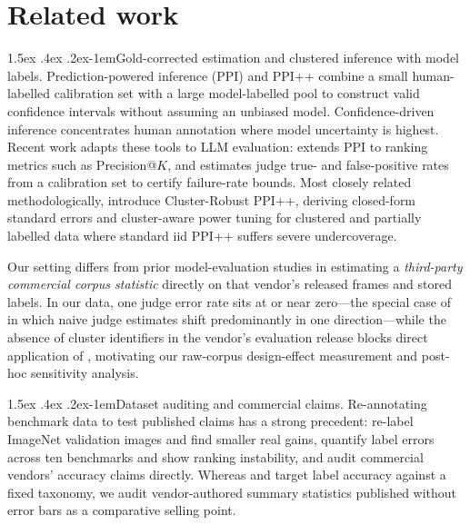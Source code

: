 \documentclass[11pt]{article}
\makeatletter
\renewcommand\paragraph{\@startsection{paragraph}{4}{\z@}%
  {1.5ex \@plus .4ex \@minus .2ex}{-1em}{\normalfont\normalsize\bfseries}}
\makeatother
\begin{document}
\section{Related work}
\label{sec:related}

\paragraph{Gold-corrected estimation and clustered inference with model labels.}
Prediction-powered inference (PPI) \citep{angelopoulos2023ppi} and PPI++
\citep{angelopoulos2023ppiplusplus} combine a small human-labelled calibration set with a large
model-labelled pool to construct valid confidence intervals without assuming an unbiased model.
Confidence-driven inference \citep{gligoric2025cdi} concentrates human annotation where model
uncertainty is highest. Recent work adapts these tools to LLM evaluation:
\citet{divekar2026ranking} extends PPI to ranking metrics such as Precision@$K$, and
\citet{feng2026noisybutvalid} estimates judge true- and false-positive rates from a calibration
set to certify failure-rate bounds. Most closely related methodologically,
\citet{broska2026crppi} introduce Cluster-Robust PPI++, deriving closed-form standard errors and
cluster-aware power tuning for clustered and partially labelled data where standard iid PPI++
suffers severe undercoverage.

Our setting differs from prior model-evaluation studies in estimating a \emph{third-party
commercial corpus statistic} directly on that vendor's released frames and stored labels. In our
data, one judge error rate sits at or near zero---the special case of
\citet{feng2026noisybutvalid} in which naive judge estimates shift predominantly in one
direction---while the absence of cluster identifiers in the vendor's evaluation release blocks
direct application of \citet{broska2026crppi}, motivating our raw-corpus design-effect
measurement and post-hoc sensitivity analysis.

\paragraph{Dataset auditing and commercial claims.}
Re-annotating benchmark data to test published claims has a strong precedent:
\citet{beyer2020imagenet} re-label ImageNet validation images and find smaller real gains,
\citet{northcutt2021labelerrors} quantify label errors across ten benchmarks and show ranking
instability, and \citet{raji2019actionable} audit commercial vendors' accuracy claims directly.
Whereas \citet{beyer2020imagenet} and \citet{northcutt2021labelerrors} target label accuracy
against a fixed taxonomy, we audit vendor-authored summary statistics published without error bars
as a comparative selling point.
\end{document}
